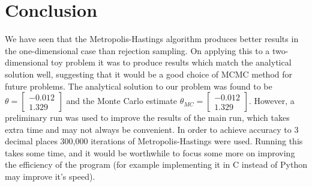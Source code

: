 \documentclass[a4paper,11pt,twoside]{article}
\begin{document}
\section{Conclusion}
We have seen that the Metropolis-Hastings algorithm produces better results in
the one-dimensional case than rejection sampling. On applying this to a
two-dimensional toy problem it was to produce results which match the
analytical solution well, suggesting that it would be a good choice of MCMC
method for future problems. The analytical solution to our problem was found to be $\theta = \begin{bmatrix} 
		-0.012 \\ 
	1.329 \end{bmatrix}$ and the Monte Carlo estimate $\theta_{MC} = \begin{bmatrix} 
		-0.012 \\ 
	1.329 \end{bmatrix}$. However, a preliminary run was used to improve the
results of the main run, which takes extra time and may not always be
convenient. In order to achieve accuracy to 3 decimal places 300,000 iterations
of Metropolis-Hastings were used. Running this takes some time, and it would be
worthwhile to focus some more on improving the efficiency of the program (for
example implementing it in C instead of Python may improve it's speed).

\appendix 
\label{appendix}
\end{document}

